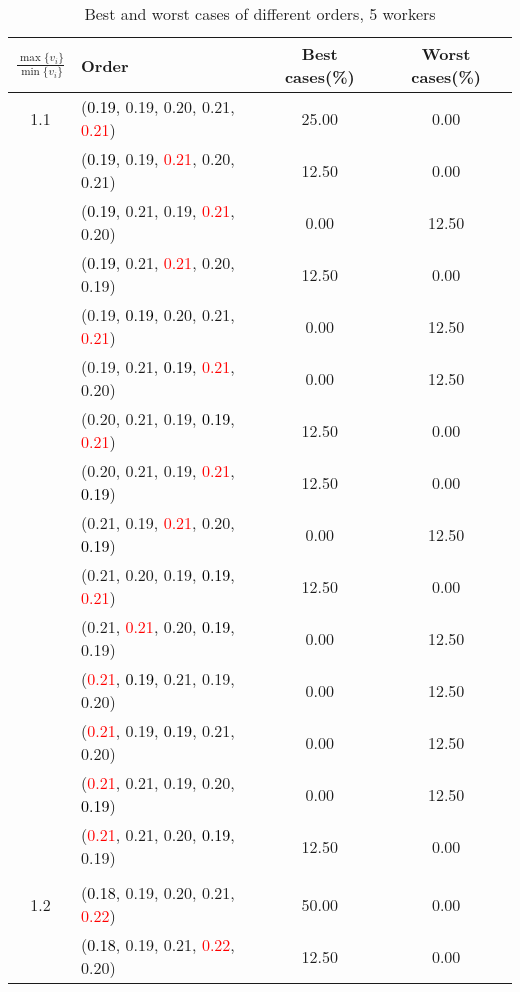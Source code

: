 \documentclass[10pt,a4paper]{report}
\begin{document}
\newpage\begin{center}
	\small
	\begin{longtable}{clcc}
		\caption{Best and worst cases of different orders, 5 workers}\\
		\toprule
		\setlength{\tabcolsep}{1mm}
		\renewcommand\baselinestretch{0.5}\selectfont
		$\frac{\max\{v_i\}}{\min\{v_i\}}$ & Order & Best cases(\%) & Worst cases(\%) \\
			\midrule		1.1			&(\textcolor{black}{0.19}, 0.19, 0.20, 0.21, \textcolor{red}{0.21})&25.00&0.00\\
			&(\textcolor{black}{0.19}, 0.19, \textcolor{red}{0.21}, 0.20, 0.21)&12.50&0.00\\
			&(\textcolor{black}{0.19}, 0.21, 0.19, \textcolor{red}{0.21}, 0.20)&0.00&12.50\\
			&(\textcolor{black}{0.19}, 0.21, \textcolor{red}{0.21}, 0.20, 0.19)&12.50&0.00\\
			&(0.19, \textcolor{black}{0.19}, 0.20, 0.21, \textcolor{red}{0.21})&0.00&12.50\\
			&(0.19, 0.21, \textcolor{black}{0.19}, \textcolor{red}{0.21}, 0.20)&0.00&12.50\\
			&(0.20, 0.21, 0.19, \textcolor{black}{0.19}, \textcolor{red}{0.21})&12.50&0.00\\
			&(0.20, 0.21, 0.19, \textcolor{red}{0.21}, \textcolor{black}{0.19})&12.50&0.00\\
			&(0.21, 0.19, \textcolor{red}{0.21}, 0.20, \textcolor{black}{0.19})&0.00&12.50\\
			&(0.21, 0.20, 0.19, \textcolor{black}{0.19}, \textcolor{red}{0.21})&12.50&0.00\\
			&(0.21, \textcolor{red}{0.21}, 0.20, \textcolor{black}{0.19}, 0.19)&0.00&12.50\\
			&(\textcolor{red}{0.21}, \textcolor{black}{0.19}, 0.21, 0.19, 0.20)&0.00&12.50\\
			&(\textcolor{red}{0.21}, 0.19, \textcolor{black}{0.19}, 0.21, 0.20)&0.00&12.50\\
			&(\textcolor{red}{0.21}, 0.21, 0.19, 0.20, \textcolor{black}{0.19})&0.00&12.50\\
			&(\textcolor{red}{0.21}, 0.21, 0.20, \textcolor{black}{0.19}, 0.19)&12.50&0.00\\
		&&&\\
		1.2			&(\textcolor{black}{0.18}, 0.19, 0.20, 0.21, \textcolor{red}{0.22})&50.00&0.00\\
			&(\textcolor{black}{0.18}, 0.19, 0.21, \textcolor{red}{0.22}, 0.20)&12.50&0.00\\

\end{longtable}
\end{center}
\end{document}
